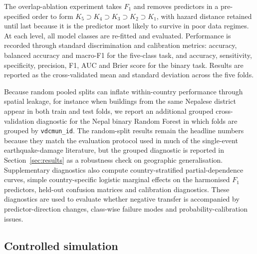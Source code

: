 \documentclass[11pt,a4paper]{article}
\begin{document}
The overlap-ablation experiment takes $F_1$ and removes predictors in a pre-specified order to form $K_5 \supset K_4 \supset K_3 \supset K_2 \supset K_1$, with hazard distance retained until last because it is the predictor most likely to survive in poor data regimes. At each level, all model classes are re-fitted and evaluated. Performance is recorded through standard discrimination and calibration metrics: accuracy, balanced accuracy and macro-F1 for the five-class task, and accuracy, sensitivity, specificity, precision, F1, AUC and Brier score for the binary task. Results are reported as the cross-validated mean and standard deviation across the five folds.

Because random pooled splits can inflate within-country performance through spatial leakage, for instance when buildings from the same Nepalese district appear in both train and test folds, we report an additional grouped cross-validation diagnostic for the Nepal binary Random Forest in which folds are grouped by \texttt{vdcmun\_id}. The random-split results remain the headline numbers because they match the evaluation protocol used in much of the single-event earthquake-damage literature, but the grouped diagnostic is reported in Section~\ref{sec:results} as a robustness check on geographic generalisation. Supplementary diagnostics also compute country-stratified partial-dependence curves, simple country-specific logistic marginal effects on the harmonised $F_1$ predictors, held-out confusion matrices and calibration diagnostics. These diagnostics are used to evaluate whether negative transfer is accompanied by predictor-direction changes, class-wise failure modes and probability-calibration issues.

\subsection{Controlled simulation}
\label{subsec:methods-simulation}
\end{document}
